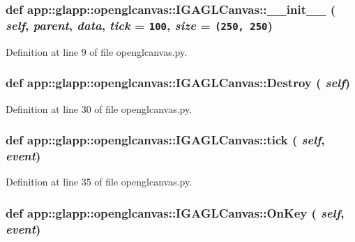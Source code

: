 \subsubsection{\setlength{\rightskip}{0pt plus 5cm}def app::glapp::openglcanvas::IGAGLCanvas::\_\-\_\-init\_\-\_\- ( {\em self},  {\em parent},  {\em data},  {\em tick} = {\tt 100},  {\em size} = {\tt (250,~250})}\label{classapp_1_1glapp_1_1openglcanvas_1_1IGAGLCanvas_8329702fed6e9e93196057eb6304df52}




Definition at line 9 of file openglcanvas.py.
\subsubsection{\setlength{\rightskip}{0pt plus 5cm}def app::glapp::openglcanvas::IGAGLCanvas::Destroy ( {\em self})}\label{classapp_1_1glapp_1_1openglcanvas_1_1IGAGLCanvas_37c73058ef7dc6ba53a05bc43a413312}




Definition at line 30 of file openglcanvas.py.
\subsubsection{\setlength{\rightskip}{0pt plus 5cm}def app::glapp::openglcanvas::IGAGLCanvas::tick ( {\em self},  {\em event})}\label{classapp_1_1glapp_1_1openglcanvas_1_1IGAGLCanvas_7e47752823ccfadde0857643dcfc87e5}




Definition at line 35 of file openglcanvas.py.
\subsubsection{\setlength{\rightskip}{0pt plus 5cm}def app::glapp::openglcanvas::IGAGLCanvas::OnKey ( {\em self},  {\em event})}\label{classapp_1_1glapp_1_1openglcanvas_1_1IGAGLCanvas_857296d0271e9a141420c234ab78566a}




